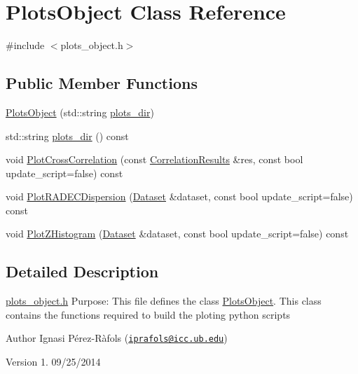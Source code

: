 \hypertarget{class_plots_object}{\section{Plots\-Object Class Reference}
\label{class_plots_object}
}


{\ttfamily \#include $<$plots\-\_\-object.\-h$>$}

\subsection*{Public Member Functions}
\begin{DoxyCompactItemize}
\item 
\hyperlink{class_plots_object_a0fa021a139a27541cc86c6fd59d9e01b}{Plots\-Object} (std\-::string \hyperlink{class_plots_object_a1459f65b0e00e0fbfe4c4db86d30b9ce}{plots\-\_\-dir})
\item 
std\-::string \hyperlink{class_plots_object_a1459f65b0e00e0fbfe4c4db86d30b9ce}{plots\-\_\-dir} () const 
\item 
void \hyperlink{class_plots_object_ad13167224503d9656c01ff5290a1a5fc}{Plot\-Cross\-Correlation} (const \hyperlink{class_correlation_results}{Correlation\-Results} \&res, const bool update\-\_\-script=false) const 
\item 
void \hyperlink{class_plots_object_a263567522eff9110c743f3738d65ae59}{Plot\-R\-A\-D\-E\-C\-Dispersion} (\hyperlink{class_dataset}{Dataset} \&dataset, const bool update\-\_\-script=false) const 
\item 
void \hyperlink{class_plots_object_a255406482f2ee35c41c7349064cf6ade}{Plot\-Z\-Histogram} (\hyperlink{class_dataset}{Dataset} \&dataset, const bool update\-\_\-script=false) const 
\end{DoxyCompactItemize}


\subsection{Detailed Description}
\hyperlink{plots__object_8h}{plots\-\_\-object.\-h} Purpose\-: This file defines the class \hyperlink{class_plots_object}{Plots\-Object}. This class contains the functions required to build the ploting python scripts

\begin{DoxyAuthor}{Author}
Ignasi Pérez-\/\-Ràfols (\href{mailto:iprafols@icc.ub.edu}{\tt iprafols@icc.\-ub.\-edu}) 
\end{DoxyAuthor}
\begin{DoxyVersion}{Version}
1. 09/25/2014 
\end{DoxyVersion}


